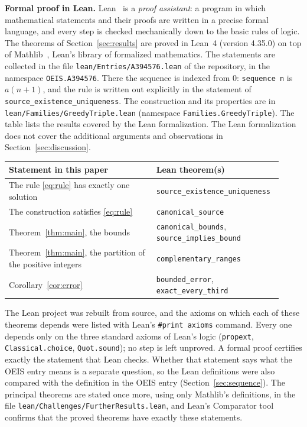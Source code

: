 \documentclass[11pt,a4paper]{article}
\theoremstyle{definition}
\theoremstyle{remark}
\newcommand{\para}[1]{\par\medskip\noindent\textbf{#1}\enspace}
\begin{document}
\para{Formal proof in Lean.}
Lean~\cite{lean} is a \emph{proof assistant}: a program in which mathematical statements and their proofs are written
in a precise formal language, and every step is checked mechanically down to the basic rules of logic. The theorems of Section~\ref{sec:results} are proved in Lean~4 (version 4.35.0) on top of
Mathlib~\cite{mathlib}, Lean's library of formalized mathematics. The statements are collected in the file \texttt{lean/Entries/A394576.lean} of the repository,
in the namespace \texttt{OEIS.A394576}. There the sequence is indexed from $0$: \texttt{sequence n} is $a(n+1)$, and the rule is written out
explicitly in the statement of \texttt{source\_existence\_uniqueness}. The construction and its properties are in
\texttt{lean/Families/GreedyTriple.lean} (namespace \texttt{Families.GreedyTriple}).
The table lists the results covered by the Lean formalization. The Lean formalization does not cover the additional arguments and observations in Section~\ref{sec:discussion}.
\begin{center}\small\renewcommand{\arraystretch}{1.25}
\begin{tabular}{>{\raggedright\arraybackslash}p{0.52\linewidth}>{\raggedright\arraybackslash}p{0.4\linewidth}}
\toprule
Statement in this paper & Lean theorem(s)\\
\midrule
The rule \eqref{eq:rule} has exactly one solution & \texttt{source\_\allowbreak{}existence\_\allowbreak{}uniqueness} \\
The construction satisfies \eqref{eq:rule} & \texttt{canonical\_\allowbreak{}source} \\
Theorem~\ref{thm:main}, the bounds & \texttt{canonical\_\allowbreak{}bounds}, \texttt{source\_\allowbreak{}implies\_\allowbreak{}bound} \\
Theorem~\ref{thm:main}, the partition of the positive integers & \texttt{complementary\_\allowbreak{}ranges} \\
Corollary~\ref{cor:error} & \texttt{bounded\_\allowbreak{}error}, \texttt{exact\_\allowbreak{}every\_\allowbreak{}third} \\
\bottomrule
\end{tabular}
\end{center}
The Lean project was rebuilt from source, and the axioms on which each of these theorems depends were listed with
Lean's \texttt{\#print axioms} command. Every one depends only on the three standard axioms of Lean's logic
(\texttt{propext}, \texttt{Classical.choice}, \texttt{Quot.sound}); no step is left unproved. A formal proof certifies
exactly the statement that Lean checks. Whether that statement says what the OEIS entry means is a separate question,
so the Lean definitions were also compared with the definition in the OEIS entry
(Section~\ref{sec:sequence}). The principal theorems are stated once more, using only Mathlib's definitions, in the
file \texttt{lean/Challenges/FurtherResults.lean}, and Lean's Comparator tool confirms that the
proved theorems have exactly these statements.
\end{document}
